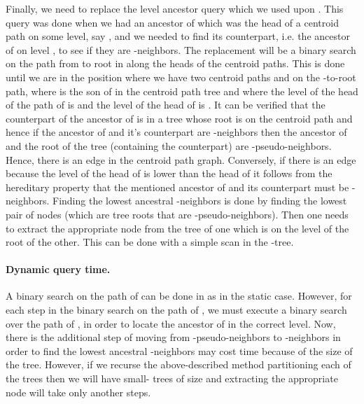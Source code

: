 \documentclass[11pt]{article}
\begin{document}
Finally, we need to replace the level ancestor query which we used
upon . This query was done when we had an ancestor of  which was the
head of a centroid path  on some level, say , and we needed to find
its counterpart, i.e. the ancestor of  on level , to see if they are
-neighbors. The replacement will be a binary search on the path from
 to root in  along the heads of the centroid paths. This is done
until we are in the position where we have two centroid paths  and
 on the -to-root path, where  is the son of  in the
centroid path tree and where the level of the head of the path of  is
 and the level of the head of  is . It can be verified
that the counterpart of the ancestor of  is in a  tree whose root
is on the centroid path  and hence if the ancestor of  and it's counterpart are -neighbors then
the ancestor of  and the root of the  tree (containing the counterpart) are -pseudo-neighbors.
Hence, there is an edge  in the centroid path graph. Conversely,
if there is an edge  because the level of the head of  is
lower than the head of  it follows from the hereditary property that
the mentioned ancestor of  and its counterpart must be -neighbors.
Finding the lowest ancestral -neighbors is done by finding the lowest
pair of nodes (which are  tree roots that are -pseudo-neighbors). Then
one needs to extract the appropriate node from the  tree of one which
is on the level of the root of the other. This can be done with a simple
scan in the -tree.

\paragraph{Dynamic query time.}
A binary search on the path of  can be done in  as in the static
case. However, for each step in the binary search on the path of , we must
execute a binary search over the path of , in order to locate the ancestor of  in
the correct level. Now, there is the additional step of moving from -pseudo-neighbors to
-neighbors in order to find the lowest ancestral -neighbors may cost
 time because of the size of the  tree. However, if we
recurse the above-described method partitioning each of the  trees
then we will have small- trees of size  and extracting
the appropriate node will take only another  steps.
\end{document}
